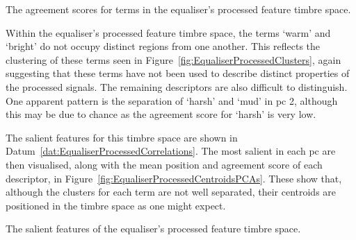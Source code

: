 			\begin{table}[h!]
				\centering
				
				\caption{The agreement scores for terms in the 
					 equaliser's processed feature timbre space.}
				\label{tab:EqualiserProcessedAgreements}
			\end{table}

			Within the equaliser's processed feature timbre space, the terms `warm' and `bright' do not occupy
			distinct regions from one another. This reflects the clustering of these terms seen in
			Figure~\ref{fig:EqualiserProcessedClusters}, again suggesting that these terms have not been used
			to describe distinct properties of the processed signals. The remaining descriptors are also
			difficult to distinguish. One apparent pattern is the separation of `harsh' and `mud' in
			\acrshort{pc} 2, although this may be due to chance as the agreement score for `harsh' is very low.

			The salient features for this timbre space are shown in
			Datum~\ref{dat:EqualiserProcessedCorrelations}. The most salient in each \acrshort{pc} are then
			visualised, along with the mean position and agreement score of each descriptor, in
			Figure~\ref{fig:EqualiserProcessedCentroidsPCAs}. These show that, although the clusters for each
			term are not well separated, their centroids are positioned in the timbre space as one might
			expect.

			\begin{datum}[h!]
				\centering
				\begin{minipage}{0.9\textwidth}
					
				\end{minipage}
				\caption{The salient features of the equaliser's
					 processed feature timbre space.}
				\label{dat:EqualiserProcessedCorrelations}
			\end{datum}

